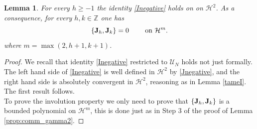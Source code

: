 \documentclass[reqno,11pt]{amsart}
\theoremstyle{plain}
\numberwithin{equation}{section}
\newtheorem{lemma}[theorem]{Lemma}
\newcommand{\N}{\mathbb{N}}
\newcommand{\Z}{\mathbb{Z}}
\renewcommand{\H}{\mathcal{H}}
\newcommand{\I}{{\texttt{\bf J}}}
\newcommand{\cI}{{\mathcal I}}
\begin{document}
{\begin{lemma}\label{invonegative}
	For every $h\geq -1$ the identity \eqref{Inegative} holds on
	on $\mathcal{H}^2$.
As a consequence, for every $h,k\in \Z$  one has
	\begin{equation*}\label{PoissonMista}
	\{\I_{h},\I_k\}=0 \qquad\text{ on }\mathcal{H}^{m}.
	\end{equation*}
	where $m= \max(2, h+1,k+1)$.
\end{lemma}
\begin{proof}
	We recall that  identity \eqref{Inegative} restricted to
	$\mathscr{U}_N$ holds not just formally. The left hand side of \eqref{Inegative} is well defined in $\H^2$ by \eqref{Jnegative}, and the right hand side is absolutely convergent in $\H^2$, reasoning as in Lemma \ref{tameI}. The first result follows.
	\\
	To prove the involution property we only need to prove that $	\{\I_{h},\I_k\}$ is a bounded polynomial on $\mathcal{H}^{m}$, this is done just as in Step 3 of the proof of Lemma \ref{prop:comm_gamma2}.

\end{proof}}
\end{document}
